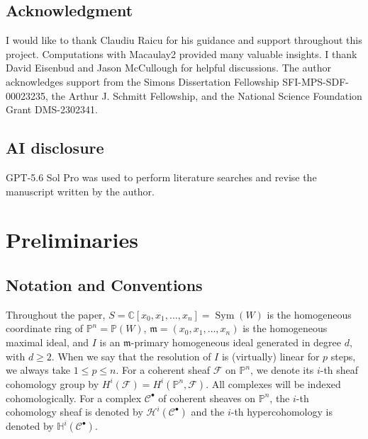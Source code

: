\documentclass[11pt,letterpaper,reqno]{amsart}
\newcommand{\CC}{\mathbb{C}}
\newcommand{\m}{\mathfrak{m}}
\newcommand{\Sym}{\operatorname{Sym}}
\newcommand{\mc}[1]{\mathcal{#1}}
\def\PP{{\mathbb P}}
\theoremstyle{definition}
\numberwithin{equation}{section}
\begin{document}
\subsection*{Acknowledgment}
I would like to thank Claudiu Raicu for his guidance and support throughout this project. Computations with Macaulay2 \cite{GS} provided many valuable insights. I thank David Eisenbud and Jason McCullough for helpful discussions. The author acknowledges support from the Simons Dissertation Fellowship SFI-MPS-SDF-00023235, the Arthur J. Schmitt Fellowship, and the National Science Foundation Grant DMS-2302341.

\subsection*{AI disclosure} GPT-5.6 Sol Pro was used to perform literature searches and revise the manuscript written by the author.

\section{Preliminaries}\label{sec:prelim}
\subsection{Notation and Conventions}
Throughout the paper, $S = \CC[x_0,x_1,\dots,x_n] = \Sym(W)$ is the homogeneous coordinate ring of $\PP^n = \PP(W)$, $\m = (x_0,x_1,\dots, x_n)$ is the homogeneous maximal ideal, and $I$ is an $\m$-primary homogeneous ideal generated in degree $d$, with $d \ge 2$. When we say that the resolution of $I$ is (virtually) linear for $p$ steps, we always take $1 \le p \le n$. For a coherent sheaf $\mc{F}$ on $\PP^n$, we denote its $i$-th sheaf cohomology group by $H^i(\mc{F}) = H^i(\PP^n,\mc{F})$. All complexes will be indexed cohomologically. For a complex $\mc{C}^\bullet$ of coherent sheaves on $\PP^n$, the $i$-th cohomology sheaf is denoted by $\mc{H}^i(\mc{C}^\bullet)$ and the $i$-th hypercohomology is denoted by $\mathbb{H}^i(\mc{C}^\bullet)$.
\end{document}
